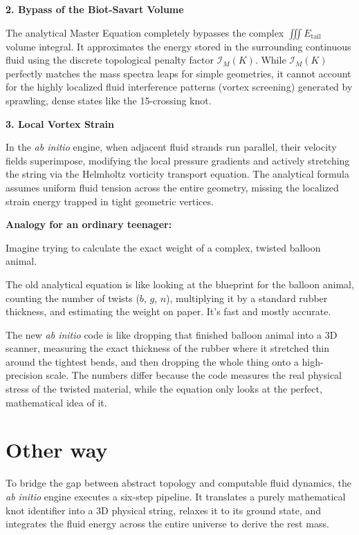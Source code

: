 \documentclass[11pt]{article}
\begin{document}
\textbf{2. Bypass of the Biot-Savart Volume}

The analytical Master Equation completely bypasses the complex $\iiint E_{\text{tail}}$ volume integral. It approximates the energy stored in the surrounding continuous fluid using the discrete topological penalty factor $\mathcal{I}_M(K)$. While $\mathcal{I}_M(K)$ perfectly matches the mass spectra leaps for simple geometries, it cannot account for the highly localized fluid interference patterns (vortex screening) generated by sprawling, dense states like the 15-crossing knot.

\textbf{3. Local Vortex Strain}

In the \textit{ab initio} engine, when adjacent fluid strands run parallel, their velocity fields superimpose, modifying the local pressure gradients and actively stretching the string via the Helmholtz vorticity transport equation. The analytical formula assumes uniform fluid tension across the entire geometry, missing the localized strain energy trapped in tight geometric vertices.

\textbf{Analogy for an ordinary teenager:}

Imagine trying to calculate the exact weight of a complex, twisted balloon animal.

The old analytical equation is like looking at the blueprint for the balloon animal, counting the number of twists ($b$, $g$, $n$), multiplying it by a standard rubber thickness, and estimating the weight on paper. It's fast and mostly accurate.

The new \textit{ab initio} code is like dropping that finished balloon animal into a 3D scanner, measuring the exact thickness of the rubber where it stretched thin around the tightest bends, and then dropping the whole thing onto a high-precision scale. The numbers differ because the code measures the real physical stress of the twisted material, while the equation only looks at the perfect, mathematical idea of it.


\section{Other way}


To bridge the gap between abstract topology and computable fluid dynamics, the \textit{ab initio} engine executes a six-step pipeline. It translates a purely mathematical knot identifier into a 3D physical string, relaxes it to its ground state, and integrates the fluid energy across the entire universe to derive the rest mass.
\end{document}
